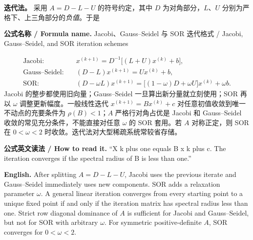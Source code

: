 \documentclass[UTF8,11pt,a4paper]{ctexart}
\newcommand{\EN}[1]{\par\noindent\textbf{English.} #1\par}
\newcommand{\READ}[1]{\par\noindent\textbf{公式英文读法 / How to read it.} #1\par}
\newcommand{\FORMULA}[2]{\par\noindent\textbf{公式名称 / Formula name.} #1 / #2\par}
\begin{document}
\noindent\textbf{迭代法。} 采用 $A=D-L-U$ 的符号约定，其中 $D$ 为对角部分，$L$、$U$ 分别为严格下、上三角部分的\emph{负值}。于是
\FORMULA{Jacobi、Gauss--Seidel 与 SOR 迭代格式}{Jacobi, Gauss--Seidel, and SOR iteration schemes}
\[
\begin{aligned}
\text{Jacobi:}\quad &x^{(k+1)}=D^{-1}\big[(L+U)x^{(k)}+b\big],\\
\text{Gauss--Seidel:}\quad &(D-L)x^{(k+1)}=Ux^{(k)}+b,\\
\text{SOR:}\quad &(D-\omega L)x^{(k+1)}
=\big[(1-\omega)D+\omega U\big]x^{(k)}+\omega b.
\end{aligned}
\]
Jacobi 的整步都使用旧向量；Gauss--Seidel 一旦算出新分量就立刻使用；SOR 再以 $\omega$ 调整更新幅度。一般线性迭代 $x^{(k+1)}=Bx^{(k)}+c$ 对任意初值收敛到唯一不动点的充要条件为 $\rho(B)<1$；$A$ 严格行对角占优是 Jacobi 和 Gauss--Seidel 收敛的常见充分条件，不能直接对任意 $\omega$ 的 SOR 套用。若 $A$ 对称正定，则 SOR 在 $0<\omega<2$ 时收敛。迭代法对大型稀疏系统常较省存储。
\READ{“X k plus one equals B x k plus c. The iteration converges if the spectral radius of B is less than one.”}
\EN{After splitting $A=D-L-U$, Jacobi uses the previous iterate and Gauss--Seidel immediately uses new components. SOR adds a relaxation parameter $\omega$. A general linear iteration converges from every starting point to a unique fixed point if and only if the iteration matrix has spectral radius less than one. Strict row diagonal dominance of $A$ is sufficient for Jacobi and Gauss--Seidel, but not for SOR with arbitrary $\omega$. For symmetric positive-definite $A$, SOR converges for $0<\omega<2$.}
\end{document}
